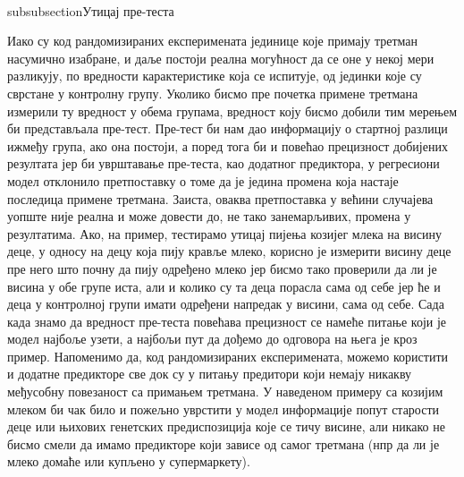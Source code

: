 \documentclass[12pt, a4paper]{article}
\begin{document}
\\subsubsection{Утицај пре-теста}

Иако су код рандомизираних експеримената јединице које примају третман насумично изабране, и даље 
постоји реална могућност да се оне у некој мери разликују, по вредности карактеристике која се 
испитује, од јединки које су сврстане у контролну групу. Уколико бисмо пре почетка примене третмана 
измерили ту вредност у обема групама, вредност коју бисмо добили тим мерењем би представљала 
пре-тест. Пре-тест би нам дао информацију о стартној разлици ижмеђу група, ако она постоји, а 
поред тога би и повећао прецизност добијених резултата јер би уврштавање пре-теста, као додатног 
предиктора, у регресиони модел отклонило претпоставку о томе да је једина промена која настаје 
последица примене третмана. Заиста, оваква претпоставка у већини случајева уопште није реална и 
може довести до, не тако занемарљивих, промена у резултатима. Ако, на пример, тестирамо утицај 
пијења козијег млека на висину деце, у односу на децу која пију кравље млеко, корисно је измерити 
висину деце пре него што почну да пију одређено млеко јер бисмо тако проверили да ли је висина у 
обе групе иста, али и колико су та деца порасла сама од себе јер ће и деца у контролној групи 
имати одређени напредак у висини, сама од себе. Сада када знамо да вредност пре-теста повећава 
прецизност се намеће питање који је модел најбоље узети, а најбољи пут да дођемо до одговора на 
њега је кроз пример. Напоменимо да, код рандомизираних експеримената, можемо користити и додатне 
предикторе све док су у питању предитори који немају никакву међусобну повезаност са примањем 
третмана. У наведеном примеру са козијим млеком би чак било и пожељно уврстити у модел информације 
попут старости деце или њихових генетских предиспозиција које се тичу висине, али никако не бисмо 
смели да имамо предикторе који зависе од самог третмана (нпр да ли је млеко домаће или купљено у 
супермаркету).
\end{document}
